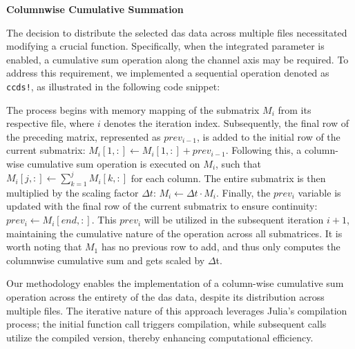 \textbf{Columnwise Cumulative Summation}

The decision to distribute the selected \acrshort{das} data across multiple files necessitated modifying a crucial function. Specifically, when the integrated parameter is enabled, a cumulative sum operation along the channel axis may be required. To address this requirement, we implemented a sequential operation denoted as \texttt{ccds!}, as illustrated in the following code snippet:



The process begins with memory mapping of the submatrix $M_i$ from its respective file, where $i$ denotes the iteration index. Subsequently, the final row of the preceding matrix, represented as $prev_{i-1}$, is added to the initial row of the current submatrix: $M_i[1,:] \leftarrow M_i[1,:] + prev_{i-1}$. Following this, a column-wise cumulative sum operation is executed on $M_i$, such that $M_i[j,:] \leftarrow \sum_{k=1}^j M_i[k,:]$ for each column. The entire submatrix is then multiplied by the scaling factor $\Delta t$: $M_i \leftarrow \Delta t \cdot M_i$. Finally, the $prev_i$ variable is updated with the final row of the current submatrix to ensure continuity: $prev_i \leftarrow M_i[end,:]$. This $prev_i$ will be utilized in the subsequent iteration $i+1$, maintaining the cumulative nature of the operation across all submatrices. It is worth noting that $M_1$ has no previous row to add, and thus only computes the columnwise cumulative sum and gets scaled by $\Delta$t.

Our methodology enables the implementation of a column-wise cumulative sum operation across the entirety of the \acrshort{das} data, despite its distribution across multiple files. The iterative nature of this approach leverages Julia's compilation process; the initial function call triggers compilation, while subsequent calls utilize the compiled version, thereby enhancing computational efficiency.

